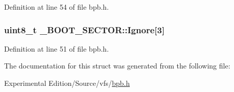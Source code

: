 Definition at line 54 of file bpb.\+h.

\subsubsection[{\texorpdfstring{Ignore}{Ignore}}]{\setlength{\rightskip}{0pt plus 5cm}uint8\+\_\+t \+\_\+\+B\+O\+O\+T\+\_\+\+S\+E\+C\+T\+O\+R\+::\+Ignore\mbox{[}3\mbox{]}}\hypertarget{struct__BOOT__SECTOR_abcae473872a0324e463ab36564130d3d}{}\label{struct__BOOT__SECTOR_abcae473872a0324e463ab36564130d3d}


Definition at line 51 of file bpb.\+h.



The documentation for this struct was generated from the following file\+:\begin{DoxyCompactItemize}
\item 
Experimental Edition/\+Source/vfs/\hyperlink{bpb_8h}{bpb.\+h}\end{DoxyCompactItemize}

